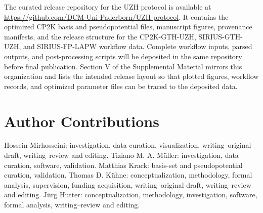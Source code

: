 \documentclass[aps,prb,reprint,amsmath,amssymb,superscriptaddress,longbibliography,floatfix]{revtex4-2}
\begin{document}
The curated release repository for the UZH protocol is available at \url{https://github.com/DCM-Uni-Paderborn/UZH-protocol}. It contains the optimized CP2K basis and pseudopotential files, manuscript figures, provenance manifests, and the release structure for the CP2K-GTH-UZH, SIRIUS-GTH-UZH, and SIRIUS-FP-LAPW workflow data. Complete workflow inputs, parsed outputs, and post-processing scripts will be deposited in the same repository before final publication. Section V of the Supplemental Material mirrors this organization and lists the intended release layout so that plotted figures, workflow records, and optimized parameter files can be traced to the deposited data.

\section*{Author Contributions}

Hossein Mirhosseini: investigation, data curation, visualization, writing--original draft, writing--review and editing. Tiziano M. A. M\"uller: investigation, data curation, software, validation. Matthias Krack: basis-set and pseudopotential curation, validation. Thomas D. K\"uhne: conceptualization, methodology, formal analysis, supervision, funding acquisition, writing--original draft, writing--review and editing. J\"urg Hutter: conceptualization, methodology, investigation, software, formal analysis, writing--review and editing.


\end{document}

